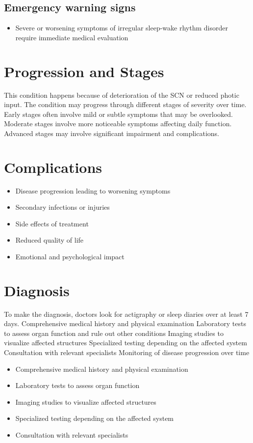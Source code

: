 \subsection{Emergency warning signs}
\begin{itemize}[noitemsep]
  \item Severe or worsening symptoms of irregular sleep-wake rhythm disorder require immediate medical evaluation
\end{itemize}
\section{Progression and Stages}
This condition happens because of deterioration of the SCN or reduced photic input. The condition may progress through different stages of severity over time. Early stages often involve mild or subtle symptoms that may be overlooked. Moderate stages involve more noticeable symptoms affecting daily function. Advanced stages may involve significant impairment and complications.
\section{Complications}
\begin{itemize}[noitemsep]
  \item Disease progression leading to worsening symptoms
  \item Secondary infections or injuries
  \item Side effects of treatment
  \item Reduced quality of life
  \item Emotional and psychological impact
\end{itemize}
\section{Diagnosis}
To make the diagnosis, doctors look for actigraphy or sleep diaries over at least 7 days. Comprehensive medical history and physical examination Laboratory tests to assess organ function and rule out other conditions Imaging studies to visualize affected structures Specialized testing depending on the affected system Consultation with relevant specialists Monitoring of disease progression over time

\begin{itemize}[noitemsep]
  \item Comprehensive medical history and physical examination
  \item Laboratory tests to assess organ function
  \item Imaging studies to visualize affected structures
  \item Specialized testing depending on the affected system
  \item Consultation with relevant specialists
\end{itemize}
